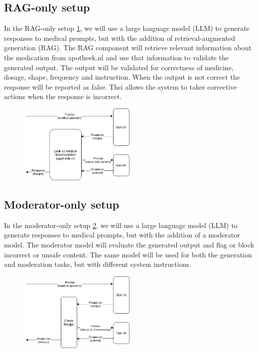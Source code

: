 \subsection{RAG-only setup}

In the RAG-only setup \ref{fig:ragSetup}, we will use a large language model (LLM) to generate responses to medical prompts, but with the addition of retrieval-augmented generation (RAG).
The RAG component will retrieve relevant information about the medication from apotheek.nl and use that information to validate the generated output.
The output will be validated for correctness of medicine, dosage, shape, frequency and instruction.
When the output is not correct the response will be reported as false. Thsi allows the system to taker corrective actions when the response is incorrect.

\begin{figure}[H]
    \includegraphics[width=0.5\textwidth]{figures/RAGSetup.png}
    \label{fig:ragSetup}
\end{figure}

\subsection{Moderator-only setup}

In the moderator-only setup \ref{fig:moderatorSetup}, we will use a large language model (LLM) to generate responses to medical prompts, but with the addition of a moderator model.
The moderator model will evaluate the generated output and flag or block incorrect or unsafe content.
The same model will be used for both the generation and moderation tasks, but with different system instructions.

\begin{figure}[H]
    \includegraphics[width=0.5\textwidth]{figures/moderatorSetup.png}
    \label{fig:moderatorSetup}
\end{figure}

